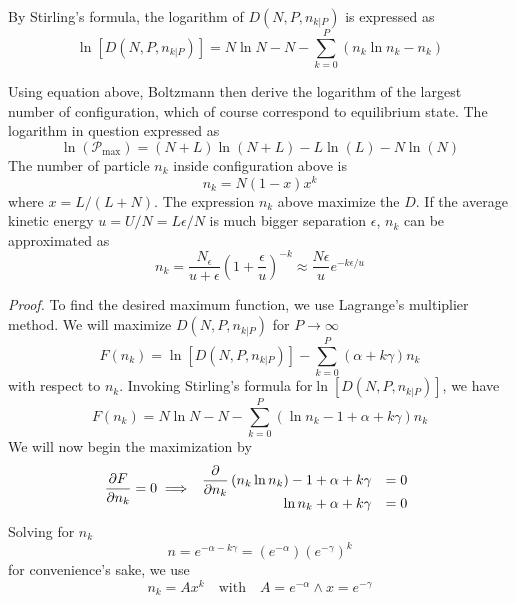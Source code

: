\documentclass[../../../Main.tex]{subfiles}
\begin{document}
By Stirling’s formula, the logarithm of $D(N , P, n_{k|P} )$ is expressed as
\begin{equation*}
    \ln\left[D(N , P, n_{k|P} )\right]=N\ln N-N-\sum_{k=0}^{P}\left(n_k\ln n_k-n_k\right)
\end{equation*}

Using equation above, Boltzmann then derive the logarithm of the largest number of configuration, which of course correspond to equilibrium state. The logarithm in question expressed as 
\begin{equation*}
    \ln(\mathcal{P}_\text{max})= (N+L)\ln (N+L) - L\ln (L)-N\ln (N)
\end{equation*}
The number of particle $n_k$ inside configuration above is 
\begin{equation*}
    n_k=N(1-x)x^k
\end{equation*}
where $x=L/(L+N)$. The expression $n_k$ above maximize the $D$. If the average kinetic energy $u=U/N=L\epsilon/N$ is much bigger separation $\epsilon$, $n_k$ can be approximated as 
\begin{equation*}
    n_k=\frac{N_\epsilon}{u+\epsilon}\left(1+\frac{\epsilon}{u}\right)^{-k}\approx\frac{N\epsilon}{u}e^{-k\epsilon/u}
\end{equation*}

\emph{Proof.} To find the desired maximum function, we use Lagrange's multiplier method. We will maximize $D(N , P, n_{k|P})$ for $P\rightarrow\infty$
\begin{equation*}
    F(n_k)=\ln\left[D(N , P, n_{k|P} )\right]- \sum_{k=0}^{P}(\alpha + k\gamma )n_k
\end{equation*}
with respect to $n_k$. Invoking Stirling's formula for$\ln\left[D(N , P, n_{k|P} )\right]$, we have
\begin{equation*}
    F(n_k)=N\ln N-N-\sum_{k=0}^{P}(\ln n_k -1 +\alpha + k\gamma )n_k
\end{equation*}
We will now begin the maximization by
\begin{equation*}
    \frac{\partial F}{\partial n_k}=0\implies\begin{array}{r l}
        \dfrac{\partial }{\partial n_k}\left(n_k\ln n_k\right)-1+ \alpha +k\gamma&=0\\
        \ln n_k+\alpha +k\gamma&=0
    \end{array}
\end{equation*}
Solving for $n_k$
\begin{equation*}
    n=e^{-\alpha-k\gamma}=\left(e^{-\alpha}\right)\left(e^{-\gamma}\right)^k
\end{equation*}
for convenience’s sake, we use 
\begin{equation*}
    n_k=Ax^k\quad \text{with}\quad A=e^{-\alpha}\land x=e^{-\gamma}
\end{equation*}
\end{document}
